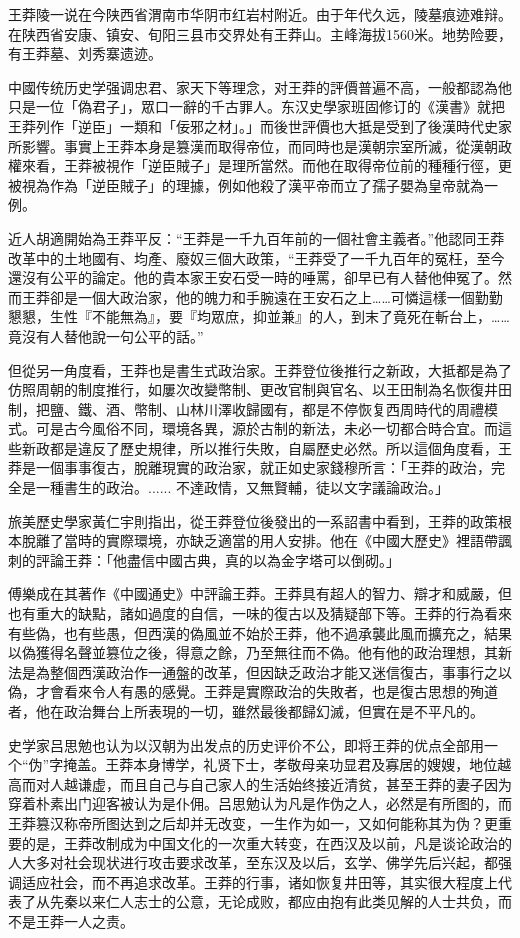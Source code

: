 王莽陵一说在今陕西省渭南市华阴市红岩村附近。由于年代久远，陵墓痕迹难辩。在陕西省安康、镇安、旬阳三县市交界处有王莽山。主峰海拔1560米。地势险要，有王莽墓、刘秀寨遗迹。

中國传统历史学强调忠君、家天下等理念，对王莽的評價普遍不高，一般都認為他只是一位「偽君子」，眾口一辭的千古罪人。东汉史學家班固修订的《漢書》就把王莽列作「逆臣」一類和「佞邪之材」。」而後世評價也大抵是受到了後漢時代史家所影響。事實上王莽本身是篡漢而取得帝位，而同時也是漢朝宗室所滅，從漢朝政權來看，王莽被視作「逆臣賊子」是理所當然。而他在取得帝位前的種種行徑，更被視為作為「逆臣賊子」的理據，例如他殺了漢平帝而立了孺子嬰為皇帝就為一例。

近人胡適開始為王莽平反：“王莽是一千九百年前的一個社會主義者。”他認同王莽改革中的土地國有、均產、廢奴三個大政策，“王莽受了一千九百年的冤枉，至今還沒有公平的論定。他的貴本家王安石受一時的唾罵，卻早已有人替他伸冤了。然而王莽卻是一個大政治家，他的魄力和手腕遠在王安石之上……可憐這樣一個勤勤懇懇，生性『不能無為』，要『均眾庶，抑並兼』的人，到末了竟死在斬台上，……竟沒有人替他說一句公平的話。”

但從另一角度看，王莽也是書生式政治家。王莽登位後推行之新政，大抵都是為了仿照周朝的制度推行，如屢次改變幣制、更改官制與官名、以王田制為名恢復井田制，把鹽、鐵、酒、幣制、山林川澤收歸國有，都是不停恢复西周時代的周禮模式。可是古今風俗不同，環境各異，源於古制的新法，未必一切都合時合宜。而這些新政都是違反了歷史規律，所以推行失敗，自屬歷史必然。所以這個角度看，王莽是一個事事復古，脫離現實的政治家，就正如史家錢穆所言：「王莽的政治，完全是一種書生的政治。...... 不達政情，又無賢輔，徒以文字議論政治。」

旅美歷史學家黃仁宇則指出，從王莽登位後發出的一系詔書中看到，王莽的政策根本脫離了當時的實際環境，亦缺乏適當的用人安排。他在《中國大歷史》裡語帶諷刺的評論王莽：「他盡信中國古典，真的以為金字塔可以倒砌。」

傅樂成在其著作《中國通史》中評論王莽。王莽具有超人的智力、辯才和威嚴，但也有重大的缺點，諸如過度的自信，一味的復古以及猜疑部下等。王莽的行為看來有些偽，也有些愚，但西漢的偽風並不始於王莽，他不過承襲此風而擴充之，結果以偽獲得名聲並篡位之後，得意之餘，乃至無往而不偽。他有他的政治理想，其新法是為整個西漢政治作一通盤的改革，但因缺乏政治才能又迷信復古，事事行之以偽，才會看來令人有愚的感覺。王莽是實際政治的失敗者，也是復古思想的殉道者，他在政治舞台上所表現的一切，雖然最後都歸幻滅，但實在是不平凡的。

史学家吕思勉也认为以汉朝为出发点的历史评价不公，即将王莽的优点全部用一个“伪”字掩盖。王莽本身博学，礼贤下士，孝敬母亲功显君及寡居的嫂嫂，地位越高而对人越谦虚，而且自己与自己家人的生活始终接近清贫，甚至王莽的妻子因为穿着朴素出门迎客被认为是仆佣。吕思勉认为凡是作伪之人，必然是有所图的，而王莽篡汉称帝所图达到之后却并无改变，一生作为如一，又如何能称其为伪？更重要的是，王莽改制成为中国文化的一次重大转变，在西汉及以前，凡是谈论政治的人大多对社会现状进行攻击要求改革，至东汉及以后，玄学、佛学先后兴起，都强调适应社会，而不再追求改革。王莽的行事，诸如恢复井田等，其实很大程度上代表了从先秦以来仁人志士的公意，无论成败，都应由抱有此类见解的人士共负，而不是王莽一人之责。

